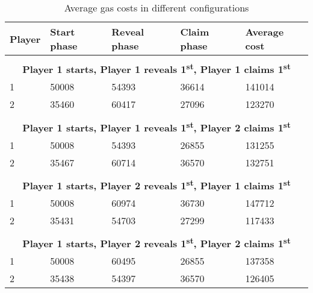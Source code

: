 \documentclass{article}
\begin{document}
    \begin{table}[H]
        \centering
        \begin{tabular}{|l l l l l|}
            \hline
            Player & Start phase & Reveal phase & Claim
            phase & Average cost \\
            \hline
            \multicolumn{4}{c}{} \\[-.5pt]
            \multicolumn{5}{c}{{\bfseries Player 1 starts, Player 1
            reveals 1\textsuperscript{st}, Player 1 claims
            1\textsuperscript{st}}} \\
            \hline
            1 & 50008 & 54393 & 36614 & 141014 \\
            2 & 35460 & 60417 & 27096 & 123270 \\
            \hline
            \multicolumn{4}{c}{} \\[-.5pt]
            \multicolumn{5}{c}{{\bfseries Player 1 starts, Player 1
            reveals 1\textsuperscript{st}, Player 2 claims
            1\textsuperscript{st}}} \\
            \hline
            1 & 50008 & 54393 & 26855 & 131255 \\
            2 & 35467 & 60714 & 36570 & 132751 \\
            \hline
            \multicolumn{4}{c}{} \\[-.5pt]
            \multicolumn{5}{c}{{\bfseries Player 1 starts, Player 2
            reveals 1\textsuperscript{st}, Player 1 claims
            1\textsuperscript{st}}} \\
            \hline
            1 & 50008 & 60974 & 36730 & 147712 \\
            2 & 35431 & 54703 & 27299 & 117433 \\
            \hline
            \multicolumn{4}{c}{} \\[-.5pt]
            \multicolumn{5}{c}{{\bfseries Player 1 starts, Player 2
            reveals 1\textsuperscript{st}, Player 2 claims
            1\textsuperscript{st}}} \\
            \hline
            1 & 50008 & 60495 & 26855 & 137358 \\
            2 & 35438 & 54397 & 36570 & 126405 \\
            \hline
        \end{tabular}

        \caption{Average gas costs in different configurations}
        \label{tab:gasTable}
    \end{table}
\end{document}
